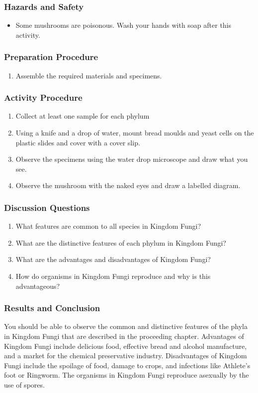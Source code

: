 \subsubsection*{Hazards and Safety}
\begin{itemize}
\item{Some mushrooms are poisonous. Wash your hands with soap after this activity.}
\end{itemize}

\subsubsection*{Preparation Procedure}
\begin{enumerate}
\item{Assemble the required materials and specimens.}
\end{enumerate}

\subsubsection*{Activity Procedure}
\begin{enumerate}
\item{Collect at least one sample for each phylum}
\item{Using a knife and a drop of water, mount bread moulds and yeast cells on the plastic slides and cover with a cover slip.}
\item{Observe the specimens using the water drop microscope and draw what you see.}
\item{Observe the mushroom with the naked eyes and draw a labelled diagram.}
\end{enumerate}

\subsubsection*{Discussion Questions}
\begin{enumerate}
\item{What features are common to all species in Kingdom Fungi?}
\item{What are the distinctive features of each phylum in Kingdom Fungi?}
\item{What are the advantages and disadvantages of Kingdom Fungi?}
\item{How do organisms in Kingdom Fungi reproduce and why is this advantageous?}
\end{enumerate}

\subsubsection*{Results and Conclusion}
You should be able to observe the common and distinctive features of the phyla in Kingdom Fungi that are described in the proceeding chapter. Advantages of Kingdom Fungi include delicious food, effective bread and alcohol manufacture, and a market for the chemical preservative industry. Disadvantages of Kingdom Fungi include the spoilage of food, damage to crops, and infections like Athlete's foot or Ringworm. The organisms in Kingdom Fungi reproduce asexually by the use of spores.



